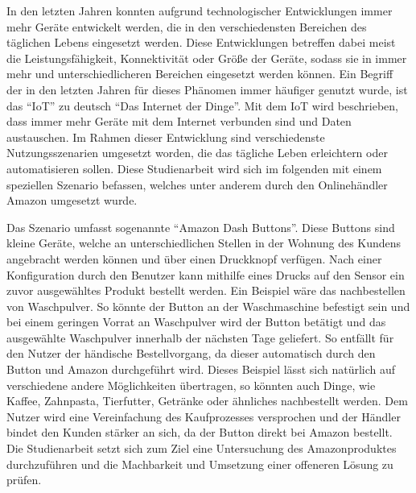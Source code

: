 In den letzten Jahren konnten aufgrund technologischer Entwicklungen immer mehr Geräte entwickelt werden, die in den verschiedensten Bereichen des täglichen Lebens eingesetzt werden. Diese Entwicklungen betreffen dabei meist die Leistungsfähigkeit, Konnektivität oder Größe der Geräte, sodass sie in immer mehr und unterschiedlicheren Bereichen eingesetzt werden können. Ein Begriff der in den letzten Jahren für dieses Phänomen immer häufiger genutzt wurde, ist das ``\ac{IoT}'' zu deutsch ``Das Internet der Dinge''. Mit dem \ac{IoT} wird beschrieben, dass immer mehr Geräte mit dem Internet verbunden sind und Daten austauschen. Im Rahmen dieser Entwicklung sind verschiedenste Nutzungsszenarien umgesetzt worden, die das tägliche Leben erleichtern oder automatisieren sollen. Diese Studienarbeit wird sich im folgenden mit einem speziellen Szenario befassen, welches unter anderem durch den Onlinehändler Amazon umgesetzt wurde.

Das Szenario umfasst sogenannte ``Amazon Dash Buttons''. Diese Buttons sind kleine Geräte, welche an unterschiedlichen Stellen in der Wohnung des Kundens angebracht werden können und über einen Druckknopf verfügen. Nach einer Konfiguration durch den Benutzer kann mithilfe eines Drucks auf den Sensor ein zuvor ausgewähltes Produkt bestellt werden. Ein Beispiel wäre das nachbestellen von Waschpulver. So könnte der Button an der Waschmaschine befestigt sein und bei einem geringen Vorrat an Waschpulver wird der Button betätigt und das ausgewählte Waschpulver innerhalb der nächsten Tage geliefert. So entfällt für den Nutzer der händische Bestellvorgang, da dieser automatisch durch den Button und Amazon durchgeführt wird. Dieses Beispiel lässt sich natürlich auf verschiedene andere Möglichkeiten übertragen, so könnten auch Dinge, wie Kaffee, Zahnpasta, Tierfutter, Getränke oder ähnliches nachbestellt werden. Dem Nutzer wird eine Vereinfachung des Kaufprozesses versprochen und der Händler bindet den Kunden stärker an sich, da der Button direkt bei Amazon bestellt. 
Die Studienarbeit setzt sich zum Ziel eine Untersuchung des Amazonproduktes durchzuführen und die Machbarkeit und Umsetzung einer offeneren Lösung zu prüfen. 

